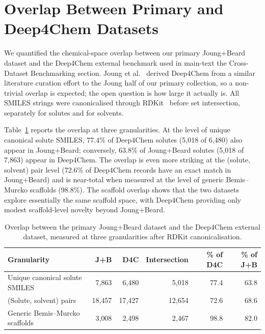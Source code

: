 \documentclass[journal=jcisd8,manuscript=suppinfo]{achemso}
\begin{document}
\section{Overlap Between Primary and Deep4Chem Datasets}
\label{si:deep4chem_overlap}

We quantified the chemical-space overlap between our primary Joung+Beard dataset and the Deep4Chem external benchmark used in main-text the Cross-Dataset Benchmarking section. Joung et al.~\cite{joung2021deep} derived Deep4Chem from a similar literature curation effort to the Joung half of our primary collection, so a non-trivial overlap is expected; the open question is how large it actually is. All SMILES strings were canonicalised through RDKit~\cite{landrumRdkitRdkit2020_03_12020} before set intersection, separately for solutes and for solvents.

Table~\ref{tab:si_d4c_overlap} reports the overlap at three granularities. At the level of unique canonical solute SMILES, 77.4\% of Deep4Chem solutes (5{,}018 of 6{,}480) also appear in Joung+Beard; conversely, 63.8\% of Joung+Beard solutes (5{,}018 of 7{,}863) appear in Deep4Chem. The overlap is even more striking at the (solute, solvent) pair level (72.6\% of Deep4Chem records have an exact match in Joung+Beard) and is near-total when measured at the level of generic Bemis--Murcko scaffolds (98.8\%). The scaffold overlap shows that the two datasets explore essentially the same scaffold space, with Deep4Chem providing only modest scaffold-level novelty beyond Joung+Beard.

\begin{table}[htbp]
\centering
\caption{Overlap between the primary Joung+Beard dataset and the Deep4Chem external dataset, measured at three granularities after RDKit canonicalisation.}
\label{tab:si_d4c_overlap}
\small
\begin{tabular}{lrrrrr}
\toprule
\textbf{Granularity} & \textbf{J+B} & \textbf{D4C} & \textbf{Intersection} & \textbf{\% of D4C} & \textbf{\% of J+B} \\
\midrule
Unique canonical solute SMILES & 7{,}863 & 6{,}480 & 5{,}018 & 77.4 & 63.8 \\
(Solute, solvent) pairs & 18{,}457 & 17{,}427 & 12{,}654 & 72.6 & 68.6 \\
Generic Bemis--Murcko scaffolds & 3{,}008 & 2{,}498 & 2{,}467 & 98.8 & 82.0 \\
\bottomrule
\end{tabular}
\end{table}
\end{document}
